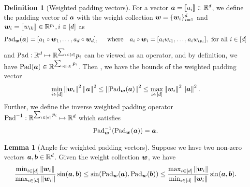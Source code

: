 \documentclass[lettersize,journal]{IEEEtran}
\theoremstyle{definition}
\newtheorem{lem}{Lemma}
\theoremstyle{definition}
\newtheorem{defn}{Definition}
\begin{document}
\begin{defn}[Weighted padding vectors]\label{def:pad} For a vector $\bm{a} = \llbracket a_i \rrbracket \in \mathbb{R}^d$, we define the padding vector of $\bm{a}$ with the weight collection $\bm{w} = \{\bm{w}_i\}_{i = 1}^d$ and $\bm{w}_i = \llbracket w_{ik} \rrbracket \in \mathbb{R}^{p_i}, i \in [d]$ as
\begin{equation}
    \text{Pad}_{\bm{w}}(\bm{a}) = [a_1 \circ \bm{w}_1, \ldots, a_d \circ \bm{w}_d], \quad \text{ where} \quad  a_i \circ \bm{w}_i = [a_i w_{i1},\ldots, a_i w_{i p_i}], \text{ for all } i \in [d]
\end{equation}
and $\text{Pad}: \mathbb{R}^{d}\mapsto \mathbb{R}^{\sum_{i\in[d]}}p_i$ can be viewed as an operator, and by definition, we have $\text{Pad} (\bm{a}) \in \mathbb{R}^{\sum_{i \in[d]} p_i}$. Then , we have the bounds of the weighted padding vector
\begin{equation}\label{eq:pad_bound}
     \min_{i \in [d]} \onorm{\mw_i}^2 \onorm{\ma}^2 \leq \onorm{\pad_{\mw}(\ma)}^2 \leq \max_{i \in [d]} \onorm{\mw_i}^2 \onorm{\ma}^2.
\end{equation}
Further, we define the inverse weighted padding operator $\text{Pad}^{-1}: \mathbb{R}^{\sum_{i\in[d]}p_i}\mapsto \mathbb{R}^d$ which satisfies 
\begin{equation}
    \text{Pad}^{-1}_{\bm{w}}(\text{Pad}_{\bm{w}}(\bm{a})) = \bm{a}.
\end{equation}
\end{defn}

\begin{lem}[Angle for weighted padding vectors]\label{lem:pad} Suppose we have two non-zero vectors $\bm{a}, \bm{b} \in \mathbb{R}^d$. Given the weight collection $\bm{w}$, we have 
\begin{equation}
   \frac{\min_{i \in [d]} \left\lVert\bm{w}_i\right\rVert}{\max_{i \in [d]} \left\lVert\bm{w}_i\right\rVert } \sin (\bm{a}, \bm{b}) \leq \sin(\text{Pad}_{\bm{w}}(\bm{a}),  \text{Pad}_{\bm{w}}(\bm{b})) \leq \frac{ \max_{i \in [d]} \left\lVert\bm{w}_i\right\rVert }{\min_{i \in [d]} \left\lVert\bm{w}_i\right\rVert} \sin (\bm{a}, \bm{b}).
\end{equation}
\end{lem}
\end{document}
